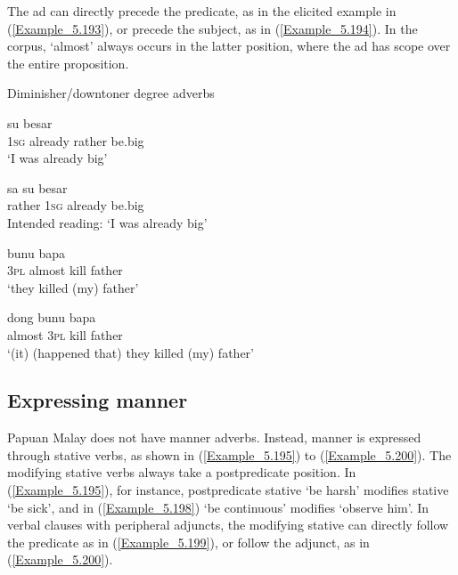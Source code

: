 The ad can directly precede the predicate, as in the elicited example in (\ref{Example_5.193}), or precede the subject, as in (\ref{Example_5.194}). In the corpus,  ‘almost’ always occurs in the latter position, where the ad has scope over the entire proposition.



\begin{styleExampleTitle}
Diminisher/downtoner degree adverbs
\end{styleExampleTitle}

\ea
\label{Example_5.191}
 {su} {} {besar}\\ %
 \textsc{1sg}  already  rather  be.big\\
 ‘I was already  big’ \textstyleExampleSource{[080922-008-CvNP.0025]}
\z

\ea
\label{Example_5.192}
\gll {*} {} {sa} {su} {besar}\\ %
 { }   rather  \textsc{1sg}  already  be.big\\
\glt 
Intended reading: ‘I was already  big’ \textstyleExampleSource{[Elicited MY131113.006]}
\z

\ea
\label{Example_5.193}
 {} {bunu} {bapa}\\ %
 \textsc{3pl}  almost  kill  father\\
\glt 
‘they  killed (my) father’ \textstyleExampleSource{[Elicited MY131113.005]}
\z

\ea
\label{Example_5.194}
 {dong} {bunu} {bapa}\\ %
 almost  \textsc{3pl}  kill  father\\
\glt
‘(it)  (happened that) they killed (my) father’ \textstyleExampleSource{[081011-022-Cv.0210]}
\z


\subsection{Expressing manner}
\label{Para_5.4.8}
Papuan Malay does not have manner adverbs. Instead, manner is expressed through stative verbs, as shown in (\ref{Example_5.195}) to (\ref{Example_5.200}). The modifying stative verbs always take a postpredicate position. In (\ref{Example_5.195}), for instance, postpredicate stative  ‘be harsh’ modifies stative  ‘be sick’, and in (\ref{Example_5.198})  ‘be continuous’ modifies  ‘observe him’. In verbal clauses with peripheral adjuncts, the modifying stative  can directly follow the predicate as in (\ref{Example_5.199}), or follow the adjunct, as in (\ref{Example_5.200}).


